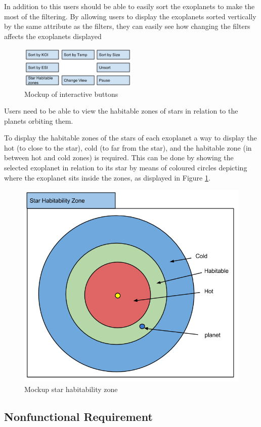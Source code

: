 \begin{enumerate}
In addition to this users should be able to easily sort the exoplanets to make
the most of the filtering. By allowing users to display the exoplanets sorted
vertically by the same attribute as the filters, they can easily see how
changing the filters affects the exoplanets displayed

\begin{figure}[H]
  \centering
      \includegraphics[width=0.5\textwidth]{images/mockButtons.png}
  \caption{Mockup of interactive buttons}  
\end{figure}

\clearpage
{\bf
 \item[R5.] Users need to be able to view the habitable zones of stars in
relation to the planets orbiting them.}

To display the habitable zones of the stars of each exoplanet a way to display
the hot (to close to the star), cold (to far from the star), and the habitable
zone (in between hot and cold zones) is required. This can be done by showing
the selected exoplanet in relation to its star by means of coloured circles
depicting where the exoplanet sits inside the zones, as displayed in Figure
\ref{fig:hab}. 

\begin{figure}[H]
  \centering
      \includegraphics[width=.5\textwidth]{images/mockStarHabitability.png}
  \caption{Mockup star habitability zone}  
  \label{fig:hab}
\end{figure}




\end{enumerate}
\clearpage
\subsection{Nonfunctional Requirement}

